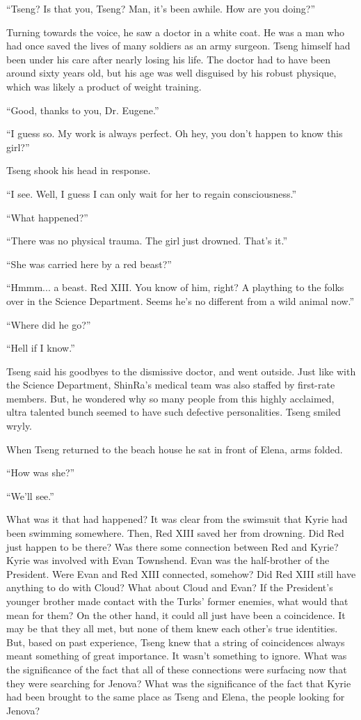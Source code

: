 \documentclass[oneside]{book}
\begin{document}
“Tseng? Is that you, Tseng? Man, it’s been awhile. How are you doing?”

Turning towards the voice, he saw a doctor in a white coat. He was a man who had once saved the lives of many soldiers as an army surgeon. Tseng himself had been under his care after nearly losing his life. The doctor had to have been around sixty years old, but his age was well disguised by his robust physique, which was likely a product of weight training.

“Good, thanks to you, Dr. Eugene.”

“I guess so. My work is always perfect. Oh hey, you don’t happen to know this girl?”

Tseng shook his head in response.

“I see. Well, I guess I can only wait for her to regain consciousness.”

“What happened?”

“There was no physical trauma. The girl just drowned. That’s it.”

“She was carried here by a red beast?”

“Hmmm... a beast. Red XIII. You know of him, right? A plaything to the folks over in the Science Department. Seems he’s no different from a wild animal now.”

“Where did he go?”

“Hell if I know.”

Tseng said his goodbyes to the dismissive doctor, and went outside. Just like with the Science Department, ShinRa’s medical team was also staffed by first-rate members. But, he wondered why so many people from this highly acclaimed, ultra talented bunch seemed to have such defective personalities. Tseng smiled wryly.

When Tseng returned to the beach house he sat in front of Elena, arms folded.

“How was she?”

“We’ll see.”

What was it that had happened? It was clear from the swimsuit that Kyrie had been swimming somewhere. Then, Red XIII saved her from drowning. Did Red just happen to be there? Was there some connection between Red and Kyrie? Kyrie was involved with Evan Townshend. Evan was the half-brother of the President. Were Evan and Red XIII connected, somehow? Did Red XIII still have anything to do with Cloud? What about Cloud and Evan? If the President’s younger brother made contact with the Turks’ former enemies, what would that mean for them? On the other hand, it could all just have been a coincidence. It may be that they all met, but none of them knew each other’s true identities. But, based on past experience, Tseng knew that a string of coincidences always meant something of great importance. It wasn’t something to ignore. What was the significance of the fact that all of these connections were surfacing now that they were searching for Jenova? What was the significance of the fact that Kyrie had been brought to the same place as Tseng and Elena, the people looking for Jenova?
\end{document}
